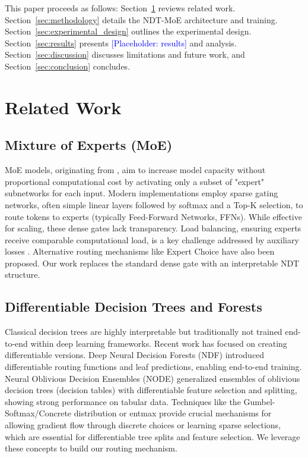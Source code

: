 \documentclass[11pt,a4paper]{article}
\newcommand{\placeholder}[1]{\textcolor{blue}{[Placeholder: #1]}}
\begin{document}
This paper proceeds as follows: Section~\ref{sec:related_work} reviews related work. Section~\ref{sec:methodology} details the NDT-MoE architecture and training. Section~\ref{sec:experimental_design} outlines the experimental design. Section~\ref{sec:results} presents \placeholder{results} and analysis. Section~\ref{sec:discussion} discusses limitations and future work, and Section~\ref{sec:conclusion} concludes.

\section{Related Work}
\label{sec:related_work}

\subsection{Mixture of Experts (MoE)}
MoE models, originating from \citep{jacobs1991adaptive}, aim to increase model capacity without proportional computational cost by activating only a subset of "expert" subnetworks for each input. Modern implementations \citep{shazeer2017outrageously, fedus2022switch} employ sparse gating networks, often simple linear layers followed by softmax and a Top-K selection, to route tokens to experts (typically Feed-Forward Networks, FFNs). While effective for scaling, these dense gates lack transparency. Load balancing, ensuring experts receive comparable computational load, is a key challenge addressed by auxiliary losses \citep{shazeer2017outrageously}. Alternative routing mechanisms like Expert Choice \citep{zhou2022mixture} have also been proposed. Our work replaces the standard dense gate with an interpretable NDT structure.

\subsection{Differentiable Decision Trees and Forests}
Classical decision trees are highly interpretable but traditionally not trained end-to-end within deep learning frameworks. Recent work has focused on creating differentiable versions. Deep Neural Decision Forests (NDF) \citep{kontschieder2015deep} introduced differentiable routing functions and leaf predictions, enabling end-to-end training. Neural Oblivious Decision Ensembles (NODE) \citep{popov2019neural} generalized ensembles of oblivious decision trees (decision tables) with differentiable feature selection and splitting, showing strong performance on tabular data. Techniques like the Gumbel-Softmax/Concrete distribution \citep{jang2017categorical, maddison2017concrete} or entmax \citep{peters2019sparse} provide crucial mechanisms for allowing gradient flow through discrete choices or learning sparse selections, which are essential for differentiable tree splits and feature selection. We leverage these concepts to build our routing mechanism.
\end{document}
